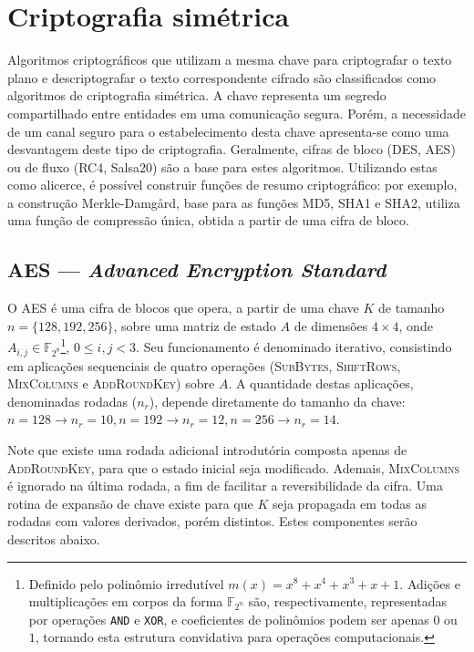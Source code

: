\documentclass{article}
\begin{document}
\section{Criptografia simétrica}

Algoritmos criptográficos que utilizam a mesma chave para criptografar o
texto plano e descriptografar o texto correspondente cifrado são classificados
como algoritmos de criptografia simétrica. A chave representa um segredo
compartilhado entre entidades em uma comunicação segura. Porém, a necessidade
de um canal seguro para o estabelecimento desta chave apresenta-se como uma
desvantagem deste tipo de criptografia. Geralmente, cifras de bloco (DES, AES)
ou de fluxo (RC4, Salsa20) são a base para estes algoritmos. Utilizando estas
como alicerce, é possível construir funções de resumo criptográfico: por
exemplo, a construção Merkle-Damgård, base para as funções MD5, SHA1 e SHA2,
utiliza uma função de compressão única, obtida a partir de uma cifra de bloco.

\subsection{AES --- \emph{Advanced Encryption Standard}}

O AES é uma cifra de blocos que opera, a partir de uma chave $K$ de tamanho $n = \{128, 192, 256\}$, sobre uma matriz de estado $A$ de dimensões $4 \times 4$, onde $A_{i,j} \in \mathbb{F}_{2^{8}}$\footnote{Definido pelo polinômio irredutível $m(x) = x^{8} + x^{4} + x^{3} + x + 1$. Adições e multiplicações em corpos da forma $\mathbb{F}_{2^n}$ são, respectivamente, representadas por operações \texttt{AND} e \texttt{XOR}, e coeficientes de polinômios podem ser apenas $0$ ou $1$, tornando esta estrutura convidativa para operações computacionais.}, $0 \leq i, j < 3$. Seu funcionamento é denominado iterativo, consistindo em aplicações sequenciais de quatro operações (\textsc{SubBytes}, \textsc{ShiftRows}, \textsc{MixColumns} e \textsc{AddRoundKey}) sobre $A$. A quantidade destas aplicações, denominadas rodadas ($n_r$), depende diretamente do tamanho da chave: $n = 128 \rightarrow n_r = 10, n = 192 \rightarrow n_r = 12, n = 256 \rightarrow n_r = 14$.

Note que existe uma rodada adicional introdutória composta apenas de \textsc{AddRoundKey},
para que o estado inicial seja modificado. Ademais, \textsc{MixColumns} é ignorado na última rodada, a fim de facilitar a reversibilidade da cifra. Uma rotina de expansão de chave existe para que $K$ seja propagada em todas as rodadas com valores derivados, porém distintos. Estes componentes serão descritos abaixo.
\end{document}
